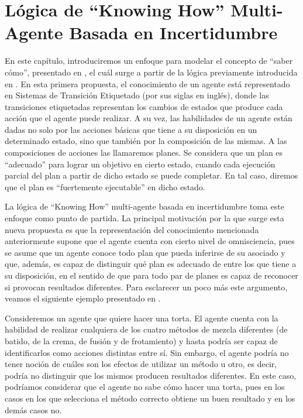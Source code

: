 \chapter{Lógica de ``Knowing How'' Multi-Agente Basada en Incertidumbre}
En este capítulo, introduciremos un enfoque para modelar el concepto de ``saber cómo'', presentado en \cite{ArecesFSV25,SaraviaPHD}, el cuál surge a partir de la 
lógica previamente introducida en \cite{Wang15KH, Wang2018GoalDirectedKH}. En esta primera propuesta, el conocimiento de un agente está 
representado en Sistemas de Transición Etiquetado (\lts por sus siglas en inglés), donde las transiciones etiquetadas representan los cambios de estados 
que produce cada acción que el agente puede realizar. A su vez, las habilidades de un agente están dadas no solo por las acciones básicas que tiene a 
su disposición en un determinado estado, sino que también por la composición de las mismas. A las composiciones de acciones las 
llamaremos planes. Se considera que un plan es ``adecuado'' para lograr un objetivo en cierto estado, cuando cada ejecución parcial del plan 
a partir de dicho estado se puede completar. En tal caso, diremos que el plan es ``fuertemente ejecutable'' en dicho estado.

La lógica de ``Knowing How'' multi-agente basada en incertidumbre toma este enfoque como punto de partida. La principal motivación por la que 
surge esta nueva propuesta es que la representación del conocimiento mencionada anteriormente supone que el agente cuenta con cierto nivel de omnisciencia, 
pues se asume que un agente conoce todo plan que pueda inferirse de su \lts asociado y que, además, es capaz de distinguir qué plan es adecuado de entre 
los que tiene a su disposición, en el sentido de que para todo par de planes es capaz de reconocer si provocan resultados diferentes.
Para esclarecer un poco más este argumento, veamos el siguiente ejemplo presentado en \cite{ArecesFSV25,SaraviaPHD}.

Consideremos un agente que quiere hacer una torta. El agente cuenta con la habilidad de realizar cualquiera de los cuatro métodos de mezcla diferentes 
(de batido, de la crema, de fusión y de frotamiento) y hasta podría ser capaz de identificarlos como acciones distintas entre sí. Sin embargo, 
el agente podría no tener noción de cuáles son los efectos de utilizar un método u otro, es decir, podría no distinguir que los mismos producen resultados 
diferentes. En este caso, podríamos considerar que el agente no sabe cómo hacer una torta, pues en los casos en los que selecciona el método correcto obtiene 
un buen resultado y en los demás casos no. 

